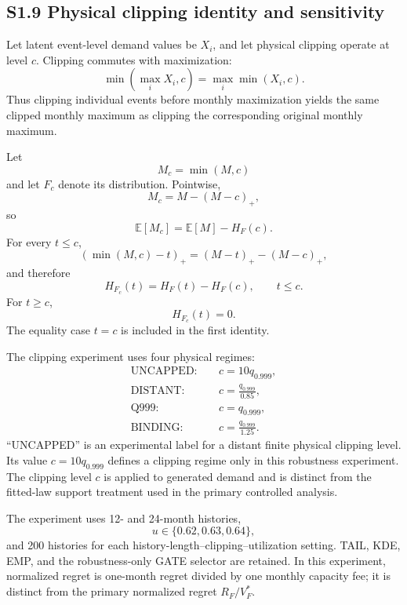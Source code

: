 \documentclass[AMA,Times1COL]{WileyNJDv5}
\begin{document}

\subsection*{S1.9 Physical clipping identity and sensitivity}

Let latent event-level demand values be \(X_i\), and let physical
clipping operate at level \(c\). Clipping commutes with maximization:
\[
\min\left(\max_iX_i,c\right)
=
\max_i\min(X_i,c).
\]
Thus clipping individual events before monthly maximization yields the
same clipped monthly maximum as clipping the corresponding original
monthly maximum.

Let
\[
M_c=\min(M,c)
\]
and let \(F_c\) denote its distribution. Pointwise,
\[
M_c=M-(M-c)_+,
\]
so
\[
\mathbb E[M_c]
=
\mathbb E[M]-H_F(c).
\]
For every \(t\leq c\),
\[
(\min(M,c)-t)_+
=
(M-t)_+-(M-c)_+,
\]
and therefore
\[
H_{F_c}(t)
=
H_F(t)-H_F(c),
\qquad
t\leq c.
\]
For \(t\geq c\),
\[
H_{F_c}(t)=0.
\]
The equality case \(t=c\) is included in the first identity.

The clipping experiment uses four physical regimes:
\[
\begin{aligned}
\mathrm{UNCAPPED}:&
\quad c=10q_{0.999},
\\
\mathrm{DISTANT}:&
\quad c=\frac{q_{0.999}}{0.85},
\\
\mathrm{Q999}:&
\quad c=q_{0.999},
\\
\mathrm{BINDING}:&
\quad c=\frac{q_{0.999}}{1.25}.
\end{aligned}
\]
``UNCAPPED'' is an experimental label for a distant finite physical
clipping level. Its value \(c=10q_{0.999}\) defines a clipping regime
only in this robustness experiment. The clipping level \(c\) is
applied to generated demand and is distinct from the fitted-law support
treatment used in the primary controlled analysis.

The experiment uses 12- and 24-month histories,
\[
u\in\{0.62,0.63,0.64\},
\]
and 200 histories for each
history-length--clipping--utilization setting. TAIL, KDE, EMP, and the
robustness-only GATE selector are retained. In this experiment, normalized regret is one-month regret divided by
one monthly capacity fee;
it is distinct from the primary normalized regret \(R_F/V_F^\ast\).
\end{document}
